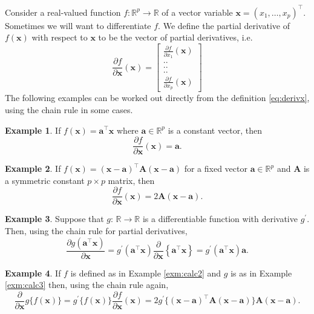\documentclass[]{book}
\theoremstyle{definition}
\theoremstyle{definition}
\newtheorem{example}{Example}[chapter]
\theoremstyle{definition}
\theoremstyle{remark}
\begin{document}
Consider a real-valued function \(f: \mathbb{R}^p \rightarrow \mathbb{R}\) of a vector variable \(\mathbf x=(x_1, \ldots , x_p)^\top\). Sometimes we will want to differentiate \(f\). We define the partial derivative of \(f(\mathbf x)\) with respect to \(\mathbf x\) to be
the vector of partial derivatives, i.e.
\begin{equation}
\frac{\partial f}{\partial \mathbf x}(\mathbf x)=\left [ \begin{array}{c} \frac{\partial f}{\partial x_1}(\mathbf x)\\
 ..\\
 ..\\
 ..\\
 \frac{\partial f}{\partial x_p}(\mathbf x)
\end{array} \right ]
\label{eq:derivx}
\end{equation}
The following examples can be worked out directly from the definition \eqref{eq:derivx}, using the chain rule in some cases.

\begin{example}
\protect\hypertarget{exm:calc1}{}{\label{exm:calc1} }If \(f(\mathbf x)=\mathbf a^\top \mathbf x\) where \(\mathbf a\in \mathbb{R}^p\) is a constant vector, then
\[
\frac{\partial f}{\partial \mathbf x}(\mathbf x)=\mathbf a.
\]
\end{example}

\begin{example}
\protect\hypertarget{exm:calc2}{}{\label{exm:calc2} }If \(f(\mathbf x)=(\mathbf x-\mathbf a)^\top \mathbf A(\mathbf x-\mathbf a)\) for a fixed vector \(\mathbf a\in \mathbb{R}^p\)
and \(\mathbf A\) is a symmetric constant \(p \times p\) matrix, then
\[
\frac{\partial f}{\partial \mathbf x}(\mathbf x)=2\mathbf A(\mathbf x-\mathbf a).
\]
\end{example}

\begin{example}
\protect\hypertarget{exm:calc3}{}{\label{exm:calc3} }Suppose that \(g: \, \mathbb{R} \rightarrow \mathbb{R}\) is a differentiable function with derivative \(g^\prime\). Then, using the chain rule for partial derivatives,
\[
\frac{\partial g(\mathbf a^\top \mathbf x)}{\partial \mathbf x}=g^{\prime}(\mathbf a^\top\mathbf x)\frac{\partial}{\partial \mathbf x}\left \{\mathbf a^\top \mathbf x\right \}=g^{\prime}(\mathbf a^\top\mathbf x) \mathbf a.
\]
\end{example}

\begin{example}
\protect\hypertarget{exm:calc4}{}{\label{exm:calc4} }If \(f\) is defined as in Example \ref{exm:calc2} and \(g\) is as in Example \ref{exm:calc3} then, using the chain rule again,
\[
\frac{\partial }{\partial \mathbf x} g\{f(\mathbf x)\}=g^{\prime} \{f(\mathbf x)\}\frac{\partial f}{\partial \mathbf x}(\mathbf x)
=2 g^{\prime}\{(\mathbf x- \mathbf a)^\top \mathbf A(\mathbf x- \mathbf a)\}\mathbf A(\mathbf x-\mathbf a).
\]
\end{example}
\end{document}
